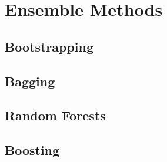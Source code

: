 \section{Ensemble Methods}

\subsection{Bootstrapping}

\subsection{Bagging}

\subsection{Random Forests}

\subsection{Boosting}